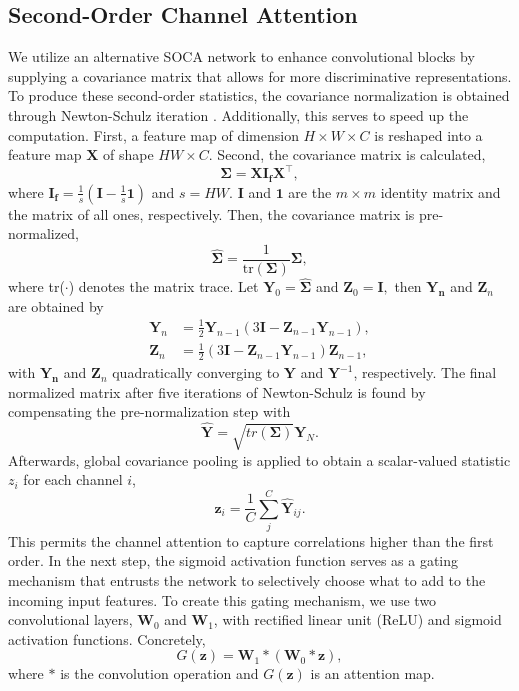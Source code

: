 \documentclass[runningheads]{llncs}
\begin{document}
\subsection{Second-Order Channel Attention}
\label{subsec:second-order_channel_attention}
We utilize an alternative SOCA network to enhance convolutional blocks by
supplying a covariance matrix that allows for more discriminative
representations. To produce these second-order statistics, the covariance
normalization is obtained through Newton-Schulz iteration
\cite{higham2008functions}. Additionally, this serves to speed up the
computation. First, a feature map of dimension $H \times W \times C$ is
reshaped into a feature map $\bm{X}$ of shape $HW \times C$.  Second, the
covariance matrix is calculated, 
\begin{equation}
  \bm{\Sigma} = \bm{X}\bm{I_f}\bm{X}^\top,
\end{equation}
where $\bm{I_f} = \frac{1}{s}(\bm{I} - \frac{1}{s}\bm{1})$ and $s=HW$. $\bm{I}$ and 
$\bm{1}$ are the $m \times m$ identity matrix and the matrix of all ones, 
respectively. Then, the covariance matrix is pre-normalized, 
\begin{equation}
  \bm{\hat{\Sigma}} = \frac{1}{\text{tr}(\bm{\Sigma})}\bm{\Sigma},
\end{equation}
where tr($\cdot$) denotes the matrix trace. Let $\bm{Y}_0 = \bm{\hat{\Sigma}}$ 
and $\bm{Z}_0 = \bm{I},$ then $\bm{Y_n}$ and $\bm{Z}_{n}$ are obtained by
\begin{align}
 \bm{Y}_n &= \frac{1}{2}\bm{Y}_{n-1}(3\bm{I} - 
                  \bm{Z}_{n-1}\bm{Y}_{n-1}),\\
  \bm{Z}_n &= \frac{1}{2}(3\bm{I} -
                      \bm{Z}_{n-1}\bm{Y}_{n-1})\bm{Z}_{n-1},
\end{align}
with $\bm{Y_n}$ and $\bm{Z}_{n}$ quadratically converging to $\bm{Y}$ and
$\bm{Y}^{-1}$, respectively. The final normalized matrix after five iterations
of Newton-Schulz is found by compensating the pre-normalization step with
\begin{equation}
  \bm{\hat{Y}} = \sqrt{tr(\bm{\Sigma})}\bm{Y}_N.
\end{equation}
Afterwards, global covariance pooling is applied to obtain a scalar-valued
statistic $z_i$ for each channel $i$, 
\begin{equation}
  \bm{z}_i = \frac{1}{C}\sum\limits_j^C \bm{\hat{Y}}_{ij}.
\end{equation}
This permits the channel attention to capture correlations higher than the
first order. In the next step, the sigmoid activation function serves as a
gating mechanism that entrusts the network to selectively choose what to add to
the incoming input features. To create this gating mechanism, we use two
convolutional layers, $\bm{W}_0$ and $\bm{W}_1$, with rectified linear unit
(ReLU) and sigmoid activation functions. Concretely, 
\begin{equation}
  G(\bm{z}) = \bm{W}_1 \ast (\bm{W}_0 \ast \bm{z}),
\end{equation}
where $\ast$ is the convolution operation and $G(\bm{z})$ is an attention map.
\end{document}
